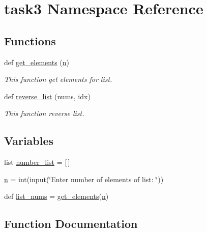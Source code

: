\hypertarget{namespacetask3}{}\section{task3 Namespace Reference}
\label{namespacetask3}
\subsection*{Functions}
\begin{DoxyCompactItemize}
\item 
def \hyperlink{namespacetask3_ad235ae9c5b4e9828ff490ff427b9bd86}{get\+\_\+elements} (\hyperlink{namespacetask3_a141f37c5285947e978ad4fb5f93d7b4d}{n})
\begin{DoxyCompactList}\small\item\em This function get elements for list. \end{DoxyCompactList}\item 
def \hyperlink{namespacetask3_abf4bcae5f5910c00fa06c3248366a8b4}{reverse\+\_\+list} (nums, idx)
\begin{DoxyCompactList}\small\item\em This function reverse list. \end{DoxyCompactList}\end{DoxyCompactItemize}
\subsection*{Variables}
\begin{DoxyCompactItemize}
\item 
list \hyperlink{namespacetask3_aec01fd90952df5299806dd54eb3b2dd9}{number\+\_\+list} = \mbox{[}$\,$\mbox{]}
\item 
\hyperlink{namespacetask3_a141f37c5285947e978ad4fb5f93d7b4d}{n} = int(input(\char`\"{}Enter number of elements of list\+: \char`\"{}))
\item 
def \hyperlink{namespacetask3_a26ec30892cf27640bc93aefe095de62a}{list\+\_\+nums} = \hyperlink{namespacetask3_ad235ae9c5b4e9828ff490ff427b9bd86}{get\+\_\+elements}(\hyperlink{namespacetask3_a141f37c5285947e978ad4fb5f93d7b4d}{n})
\end{DoxyCompactItemize}


\subsection{Function Documentation}
\mbox{\label{namespacetask3_ad235ae9c5b4e9828ff490ff427b9bd86}} 
